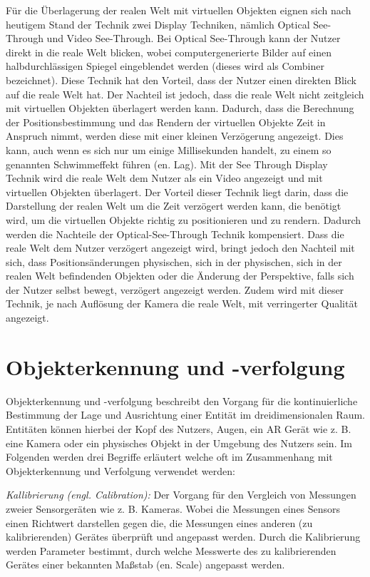 \cite[S.~32]{Tonnis2010} Für die Überlagerung der realen Welt mit virtuellen Objekten eignen sich nach heutigem Stand der Technik zwei Display Techniken, nämlich Optical See-Through und Video See-Through. 
Bei Optical See-Through kann der Nutzer direkt in die reale Welt blicken, wobei computergenerierte Bilder auf einen halbdurchlässigen Spiegel eingeblendet werden (dieses wird als Combiner bezeichnet).
Diese Technik hat den Vorteil, dass der Nutzer einen direkten Blick auf die reale Welt hat. Der Nachteil ist jedoch, dass die reale Welt nicht zeitgleich mit virtuellen Objekten überlagert werden kann. 
Dadurch, dass die Berechnung der Positionsbestimmung und das Rendern der virtuellen Objekte Zeit in Anspruch nimmt, werden diese mit einer kleinen Verzögerung angezeigt. Dies kann, auch 
wenn es sich nur um einige Millisekunden handelt, zu einem so genannten Schwimmeffekt führen (en. Lag). Mit der See Through Display Technik wird die reale Welt dem Nutzer als ein Video 
angezeigt und mit virtuellen Objekten überlagert. Der Vorteil dieser Technik liegt darin, dass die Darstellung der realen Welt um die Zeit verzögert werden kann, die benötigt wird, um die virtuellen Objekte 
richtig zu positionieren und zu rendern. Dadurch werden die Nachteile der Optical-See-Through Technik kompensiert. Dass die reale Welt dem Nutzer verzögert angezeigt wird, bringt jedoch den Nachteil mit sich, 
dass Positionsänderungen physischen, sich in der physischen, sich in der realen Welt befindenden Objekten oder die Änderung der Perspektive, falls sich der Nutzer selbst bewegt, verzögert angezeigt werden. Zudem wird mit 
dieser Technik, je nach Auflösung der Kamera die reale Welt, mit verringerter Qualität angezeigt.

\section{Objekterkennung und -verfolgung}

\cite[S.~85]{DieterSchmalstieg2016}Objekterkennung und -verfolgung beschreibt den Vorgang für die kontinuierliche Bestimmung der Lage und Ausrichtung einer Entität im dreidimensionalen Raum. 
Entitäten können hierbei der Kopf des Nutzers, Augen, ein AR Gerät wie z. B. eine Kamera oder ein physisches Objekt in der Umgebung des Nutzers sein. 
Im Folgenden werden drei Begriffe erläutert welche oft im Zusammenhang mit Objekterkennung und Verfolgung verwendet werden:
 
\textit{Kallibrierung (engl. Calibration):} Der Vorgang für den Vergleich von Messungen zweier Sensorgeräten wie z. B. Kameras. Wobei die Messungen eines Sensors einen Richtwert darstellen gegen die, die
Messungen eines anderen (zu kalibrierenden) Gerätes überprüft und angepasst werden. Durch die Kalibrierung werden Parameter bestimmt, durch welche Messwerte des zu kalibrierenden Gerätes einer bekannten 
Maßstab (en. Scale) angepasst werden. 

